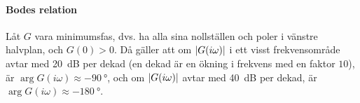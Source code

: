 \paragraph{Bodes relation}
Låt $G$ vara minimumsfas, dvs. ha alla sina nollställen och poler i vänstre halvplan, och $G(0) > 0$. Då gäller att om $\abs{G(i\omega)}$ i ett visst frekvensområde avtar med \SI{20}{\deci\bel} per dekad (en dekad är en ökning i frekvens med en faktor $10$), är $\arg{G(i\omega)}\approx \SI{-90}{\degree}$, och om $\abs{G(i\omega)}$ avtar med \SI{40}{\deci\bel} per dekad, är $\arg{G(i\omega)}\approx \SI{-180}{\degree}$.